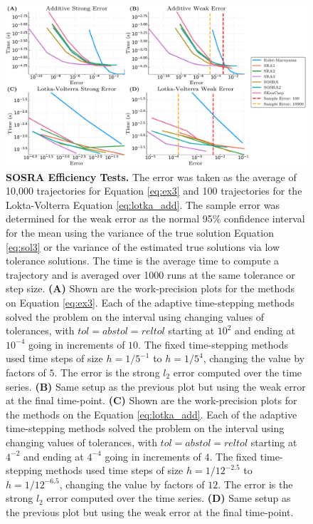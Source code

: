 \documentclass{article}
\begin{document}
\begin{center}
	\begin{figure}
		\begin{centering}
			\includegraphics[scale=0.34]{paper_figures/SRA_efficiency}
			\par\end{centering}
		\caption{\textbf{SOSRA Efficiency Tests.} The error was taken as the average
			of 10,000 trajectories for Equation \ref{eq:ex3} and 100 trajectories
			for the Lokta-Volterra Equation \ref{eq:lotka_add}. The sample error
			was determined for the weak error as the normal 95\% confidence interval
			for the mean using the variance of the true solution Equation \ref{eq:sol3}
			or the variance of the estimated true solutions via low tolerance
			solutions. The time is the average time to compute a trajectory and
			is averaged over 1000 runs at the same tolerance or step size.\textbf{
				(A)} Shown are the work-precision plots for the methods on Equation
			\ref{eq:ex3}. Each of the adaptive time-stepping methods solved the
			problem on the interval using changing values of tolerances, with
			$tol=abstol=reltol$ starting at $10^{2}$ and ending at $10^{-4}$
			going in increments of $10$. The fixed time-stepping methods used
			time steps of size $h=1/5^{-1}$ to $h=1/5^{4}$, changing the value
			by factors of $5$. The error is the strong $l_{2}$ error computed
			over the time series. \textbf{(B)} Same setup as the previous plot
			but using the weak error at the final time-point. \textbf{(C) }Shown
			are the work-precision plots for the methods on the Equation \ref{eq:lotka_add}.
			Each of the adaptive time-stepping methods solved the problem on the
			interval using changing values of tolerances, with $tol=abstol=reltol$
			starting at $4^{-2}$ and ending at $4^{-4}$ going in increments
			of $4$. The fixed time-stepping methods used time steps of size $h=1/12^{-2.5}$
			to $h=1/12^{-6.5}$, changing the value by factors of $12$. The error
			is the strong $l_{2}$ error computed over the time series. \textbf{(D)}
			Same setup as the previous plot but using the weak error at the final
			time-point. \label{fig:SOSRA-efficiency}}
	\end{figure}
	\par\end{center}
\end{document}
